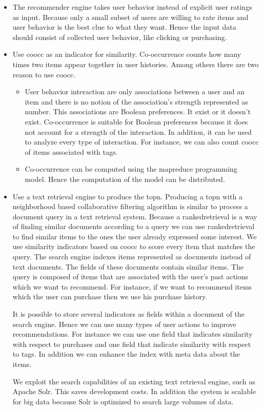 \begin{itemize}
\item The recommender engine takes user behavior instead of explicit user ratings as input. Because only a small subset of users are willing to rate items and user behavior is the best clue to what they want. Hence the input data should consist of collected user behavior, like clicking or purchasing.

\item Use \gls{coocc} as an \gls{indicator} for similarity. Co-occurrence counts how many times two items appear together in user histories. Among others there are two reason to use \gls{coocc}. 

\begin{itemize}
  \item User behavior interaction are only associations between a user and an item and there is no notion of the association's strength represented as number. This associations are Boolean preferences. It exist or it doesn't exist. Co-occurrence is suitable for Boolean preferences because it does not account for a strength of the interaction. In addition, it can be used to analyze every type of interaction. For instance, we can also count \gls{coocc} of items associated with tags.
  \item Co-occurrence can be computed using the \gls{mapreduce} programming model. Hence the computation of the model can be distributed.
\end{itemize}

\item Use a text retrieval engine to produce the \gls{topn}. Producing a \gls{topn} with a neighborhood based collaborative filtering algorithm is similar to process a document query in a text retrieval system. Because a \gls{rankedretrieval} is a way of finding similar documents according to a query we can use \gls{rankedretrieval} to find similar items to the ones the user already expressed some interest.
 We use similarity indicators based on \gls{coocc} to score every item that matches the query.
The search engine indexes items represented as documents instead of text documents. The fields of these documents contain similar items. The query is composed of items that are associated with the user's past actions which we want to recommend. For instance, if we want to recommend items which the user can purchase then we use his purchase history. 

It is possible to store several indicators as fields within a document of the search engine. Hence we can use many types of user actions to improve recommendations. For instance we can use one field that indicates similarity with respect to purchases and one field that indicate similarity with respect to \glspl{tag}. In addition we can enhance the index with meta data about the items.

We exploit the search capabilities of an existing text retrieval engine, such as Apache Solr. This saves development costs. In addition the system is \gls{scalable} for big data because Solr is optimized to search large volumes of data.

\end{itemize}

